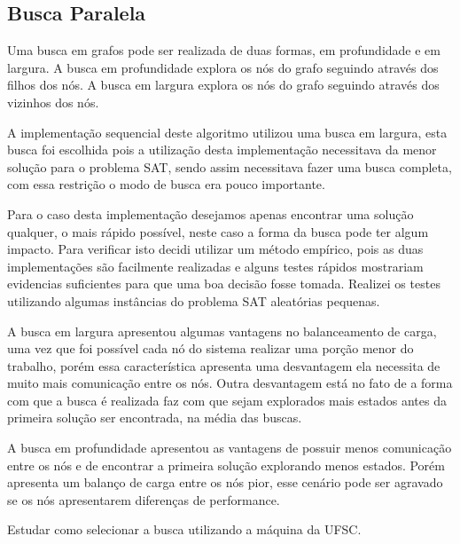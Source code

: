 \documentclass{ufsc-thesis}
\begin{document}


\subsection{Busca Paralela}

Uma busca em grafos pode ser realizada de duas formas, em profundidade e em largura. A busca em 
profundidade explora os nós do grafo seguindo através dos filhos dos nós. A busca em largura explora 
os nós do grafo seguindo através dos vizinhos dos nós.

A implementação sequencial deste algoritmo utilizou uma busca em largura, esta busca foi escolhida pois 
a utilização desta implementação necessitava da menor solução para o problema SAT, sendo assim necessitava 
fazer uma busca completa, com essa restrição o modo de busca era pouco importante.

Para o caso desta implementação desejamos apenas encontrar uma solução qualquer, o mais rápido possível, 
neste caso a forma da busca pode ter algum impacto. Para verificar isto decidi utilizar um método 
empírico, pois as duas implementações são facilmente realizadas e alguns testes rápidos mostrariam 
evidencias suficientes para que uma boa decisão fosse tomada. Realizei os testes utilizando algumas 
instâncias do problema SAT aleatórias pequenas.

A busca em largura apresentou algumas vantagens no balanceamento de carga, uma vez que foi possível 
cada nó do sistema realizar uma porção menor do trabalho, porém essa característica apresenta uma 
desvantagem ela necessita de muito mais comunicação entre os nós. Outra desvantagem está no fato de 
a forma com que a busca é realizada faz com que sejam explorados mais estados antes da primeira solução 
ser encontrada, na média das buscas.

A busca em profundidade apresentou as vantagens de possuir menos comunicação entre os nós e de encontrar 
a primeira solução explorando menos estados. Porém apresenta um balanço de carga entre os nós pior, esse 
cenário pode ser agravado se os nós apresentarem diferenças de performance.

Estudar como selecionar a busca utilizando a máquina da UFSC.
\end{document}
